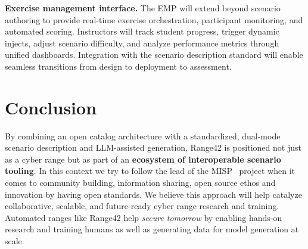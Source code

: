 \documentclass[11pt]{article}
\begin{document}
\textbf{Exercise management interface.}
The EMP will extend beyond scenario authoring to provide real-time exercise orchestration, participant monitoring, and automated scoring.
Instructors will track student progress, trigger dynamic injects, adjust scenario difficulty, and analyze performance metrics through unified dashboards.
Integration with the scenario description standard will enable seamless transitions from design to deployment to assessment.


\section{Conclusion}
By combining an open catalog architecture with a standardized, dual-mode scenario description and LLM-assisted generation, Range42 is positioned not just as a cyber range but as part of an \textbf{ecosystem of interoperable scenario tooling}. In this context we try to follow the lead of the MISP~\cite{misp} project when it comes to community building, information sharing, open source ethos and innovation by having open standards.
We believe this approach will help catalyze collaborative, scalable, and future-ready cyber range research and training.
Automated ranges like Range42 help \emph{secure tomorrow} by enabling hands-on research and training humans as well as generating data for model generation at scale.
\end{document}
